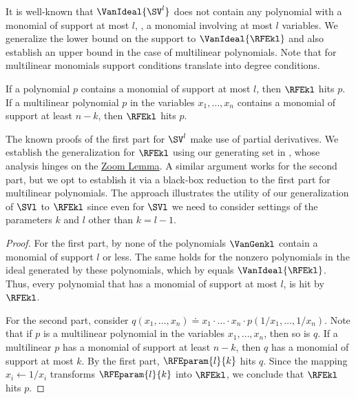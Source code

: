 It is well-known that $\VanIdeal{\SV^l}$ does not contain any polynomial with a monomial of support at most $l$, \ie, a monomial involving at most $l$ variables. We generalize the lower bound on the support to $\VanIdeal{\RFEkl}$ and also establish an upper bound in the case of multilinear polynomials. Note that for multilinear monomials support conditions translate into degree conditions.
\begin{proposition}
    \label{prop.ideal.membership.degree-bound}
    If a polynomial $p$ contains a monomial of support at most $l$, then $\RFEkl$ hits $p$. 
    If a multilinear polynomial $p$ in the variables $x_1,\dots,x_n$ contains a monomial of support at least $n-k$, then $\RFEkl$ hits $p$.
\end{proposition}
The known proofs of the first part for $\SV^l$ make use of partial derivatives. We establish the generalization for $\RFEkl$ using our generating set in , whose analysis hinges on the \hyperref[lem.multi-zsub-deriv]{Zoom Lemma}. A similar argument works for the second part, but we opt to establish it via a black-box reduction to the first part for multilinear polynomials. The approach illustrates the utility of our generalization of $\SVl$ to $\RFEkl$ since even for $\SVl$ we need to consider settings of the parameters $k$ and $l$ other than $k=l-1$. 
\begin{proof}
    For the first part, by  none of the polynomials $\VanGenkl$ contain a monomial of support $l$ or less. The same holds for the nonzero polynomials in the ideal generated by these polynomials, which by  equals $\VanIdeal{\RFEkl}$. Thus, every polynomial that has a monomial of support at most $l$, is hit by $\RFEkl$. 

    For the second part, consider $q(x_1,\dots,x_n) \doteq x_1\cdot \dots \cdot x_n\cdot p(1/x_1,\dots,1/x_n)$. Note that if $p$ is a multilinear polynomial in the variables $x_1, \dots, x_n$, then so is $q$. If a multilinear $p$ has a monomial of support at least $n-k$, then $q$ has a monomial of support at most $k$. By the first part, $\RFEparam{l}{k}$ hits $q$. Since the mapping $x_i\gets 1/x_i$ transforms $\RFEparam{l}{k}$ into $\RFEkl$, we conclude that $\RFEkl$ hits $p$.
\end{proof}

